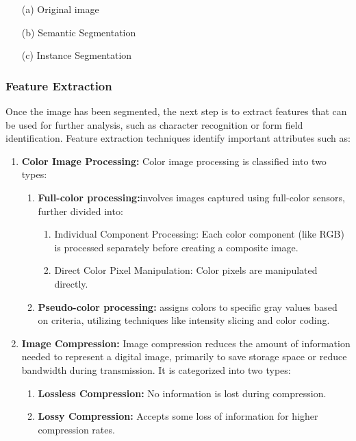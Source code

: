\documentclass[12pt,oneside,openright,a4paper]{cpe-english-project}
\begin{document}
\begin{enumerate}
    \item[(a)] Original image
    \item[(b)] Semantic Segmentation
    \item[(c)] Instance Segmentation
\end{enumerate}

\subsubsection{Feature Extraction} Once the image has been segmented, the next step is to extract  features that can be used for further analysis, such as character recognition or form field identification. Feature extraction techniques identify important attributes such as: 

\begin{enumerate}
	\item \textbf{Color Image Processing:} Color image processing is classified into two types:
	\begin{enumerate}
		\item \textbf{Full-color processing:}involves images captured using full-color sensors, further divided into:
			\begin{enumerate}
			    	\item Individual Component Processing: Each color component (like RGB) is processed separately before creating a composite image.
			    	\item Direct Color Pixel Manipulation: Color pixels are manipulated directly.
			\end{enumerate}
	    	\item \textbf{Pseudo-color processing:} assigns colors to specific gray values based on criteria, utilizing techniques like intensity slicing and color coding.
	\end{enumerate}
	\item \textbf{Image Compression:} Image compression reduces the amount of information needed to represent a digital image, primarily to save storage space or reduce bandwidth during transmission. It is categorized into two types:
	\begin{enumerate}
	    	\item \textbf{Lossless Compression:} No information is lost during compression.
	    	\item \textbf{Lossy Compression:} Accepts some loss of information for higher compression rates.
	\end{enumerate}

\end{enumerate}
\end{document}
